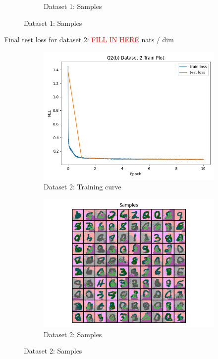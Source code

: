 \documentclass{article}
\begin{document}
\begin{enumerate}[(a)]
\begin{figure}[H]
\begin{subfigure}{0.45\textwidth}
        \caption{Dataset 1: Samples}
    \end{subfigure}
\end{figure}
Final test loss for dataset 2: \textcolor{red}{FILL IN HERE}  nats / dim
\begin{figure}[H]
    \centering
    \begin{subfigure}{0.45\textwidth}
        \centering
        \includegraphics[width=\textwidth]{figures/q2_b_dset2_train_plot.png}
        \caption{Dataset 2: Training curve}
    \end{subfigure}
    \hspace{0.2in}
    \begin{subfigure}{0.45\textwidth}
        \centering
        \includegraphics[width=\textwidth]{figures/q2_b_dset2_samples.png}
        \caption{Dataset 2: Samples}
    \end{subfigure}
\end{figure}
\end{enumerate}
\end{document}
